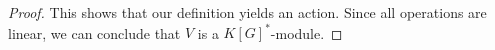 \begin{proof}
  This shows that our definition yields an action.
  Since all operations are linear, we can conclude that $V$ is a $K[G]^\ast$-module.
\end{proof}


